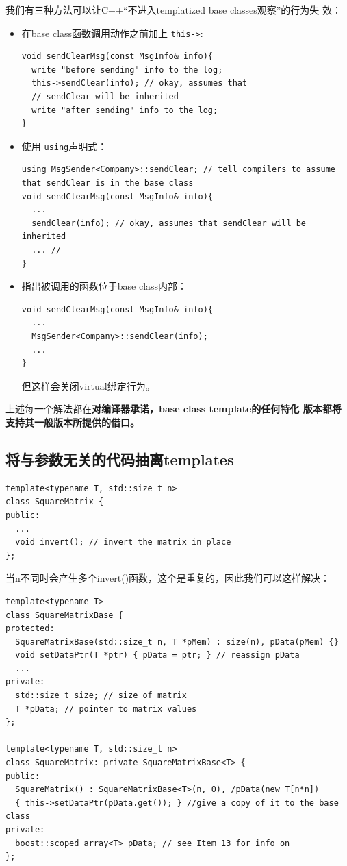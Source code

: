 \documentclass[a4paper,twoside]{article}
\theoremstyle{definition}
\theoremstyle{remark}
\numberwithin{equation}{section}
\let\OldTexttt\texttt
\renewcommand{\texttt}[1]{{\color{blue} \OldTexttt{#1}}}
\begin{document}
我们有三种方法可以让C++“不进入templatized base classes观察”的行为失
效：
\begin{itemize}
\item 在base class函数调用动作之前加上\texttt{this->}:
\begin{verbatim}
void sendClearMsg(const MsgInfo& info){
  write "before sending" info to the log;
  this->sendClear(info); // okay, assumes that
  // sendClear will be inherited
  write "after sending" info to the log;
}
\end{verbatim}
\item 使用\texttt{using}声明式：
\begin{verbatim}
using MsgSender<Company>::sendClear; // tell compilers to assume that sendClear is in the base class
void sendClearMsg(const MsgInfo& info){
  ...
  sendClear(info); // okay, assumes that sendClear will be inherited
  ... // 
}
\end{verbatim}
\item 指出被调用的函数位于base class内部：
\begin{verbatim}
void sendClearMsg(const MsgInfo& info){
  ...
  MsgSender<Company>::sendClear(info);
  ... 
}
\end{verbatim}
  但这样会关闭virtual绑定行为。
\end{itemize}

上述每一个解法都在\textbf{对编译器承诺，base class template的任何特化
  版本都将支持其一般版本所提供的借口。}

\subsection{将与参数无关的代码抽离templates}
\label{sec:Item-44}

\begin{verbatim}
template<typename T, std::size_t n> 
class SquareMatrix {
public:
  ...
  void invert(); // invert the matrix in place
};
\end{verbatim}

当n不同时会产生多个invert()函数，这个是重复的，因此我们可以这样解决：
\begin{verbatim}
template<typename T>
class SquareMatrixBase {
protected:
  SquareMatrixBase(std::size_t n, T *pMem) : size(n), pData(pMem) {} 
  void setDataPtr(T *ptr) { pData = ptr; } // reassign pData
  ...
private:
  std::size_t size; // size of matrix
  T *pData; // pointer to matrix values
};

template<typename T, std::size_t n>
class SquareMatrix: private SquareMatrixBase<T> {
public:
  SquareMatrix() : SquareMatrixBase<T>(n, 0), /pData(new T[n*n])
  { this->setDataPtr(pData.get()); } //give a copy of it to the base class
private:
  boost::scoped_array<T> pData; // see Item 13 for info on
};
\end{verbatim}
\end{document}
